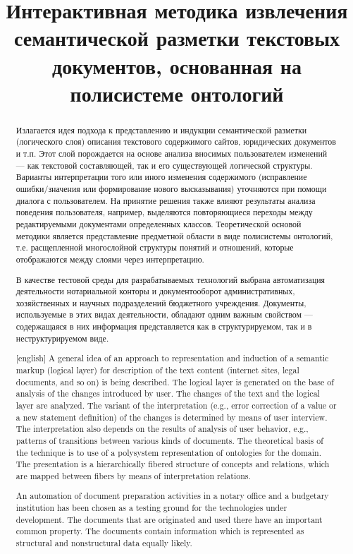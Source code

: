 \documentclass[utf8]{../IncArticle}
\title{Интерактивная методика извлечения семантической разметки
  текстовых документов, основанная на полисистеме онтологий}
\date{}
\begin{document}
\begin{abstract}

  Излагается идея подхода к представлению и индукции семантической
  разметки (логического слоя) описания текстового содержимого сайтов,
  юридических документов и т.п.  Этот слой порождается на основе
  анализа вносимых пользователем изменений --- как текстовой
  составляющей, так и его существующей логической структуры.  Варианты
  интерпретации того или иного изменения содержимого (исправление
  ошибки/значения или формирование нового высказывания) уточняются при
  помощи диалога с пользователем.  На принятие решения также влияют
  результаты анализа поведения пользователя, например, выделяются
  повторяющиеся переходы между редактируемыми документами определенных
  классов.  Теоретической основой методики является представление
  предметной области в виде полисистемы онтологий, т.е. расщепленной
  многослойной структуры понятий и отношений, которые отображаются
  между слоями через интерпретацию.

  В качестве тестовой среды для разрабатываемых технологий выбрана
  автоматизация деятельности нотариальной конторы и документооборот
  административных, хозяйственных и научных подразделений бюджетного
  учреждения.  Документы, используемые в этих видах деятельности,
  обладают одним важным свойством --- содержащаяся в них информация
  представляется как в структурируемом, так и в неструктурируемом
  виде.

\end{abstract}

\begin{abstract}[english]
  A general idea of an approach to representation and induction of a
  semantic markup (logical layer) for description of the text content
  (internet sites, legal documents, and so on) is being described.
  The logical layer is generated on the base of analysis of the
  changes introduced by user.  The changes of the text and the logical
  layer are analyzed.  The variant of the interpretation (e.g., error
  correction of a value or a new statement definition) of the changes
  is determined by means of user interview.  The interpretation also
  depends on the results of analysis of user behavior, e.g., patterns
  of transitions between various kinds of documents.  The theoretical
  basis of the technique is to use of a polysystem representation of
  ontologies for the domain.  The presentation is a hierarchically
  fibered structure of concepts and relations, which are mapped
  between fibers by means of interpretation relations.

  An automation of document preparation activities in a notary office
  and a budgetary institution has been chosen as a testing ground for
  the technologies under development.  The documents that are
  originated and used there have an important common property.  The
  documents contain information which is represented as structural and
  nonstructural data equally likely.

\end{abstract}
\end{document}
